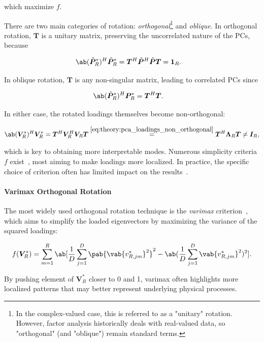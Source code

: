 which maximize $f$.

There are two main categories of rotation: \textit{orthogonal}\footnote{In the complex-valued case, this is referred to as a "unitary" rotation. However, factor analysis historically deals with real-valued data, so "orthogonal" (and "oblique") remain standard terms.} and \textit{oblique}. In orthogonal rotation, $\bm{T}$ is a unitary matrix, preserving the uncorrelated nature of the PCs, because

\begin{align*}
    \ab(\bmn{P}_R^*)^H\bmn{P}_R^* &= \bm{T}^H\bmn{P}^H\bmn{P}\bm{T} = \bm{1}_R.
\end{align*}

In oblique rotation, $\bm{T}$ is any non-singular matrix, leading to correlated PCs since

\begin{align*}
    \ab(\bmn{P}_R^*)^H\bm{P}_R^* &= \bm{T}^H\bm{T}.
\end{align*}

In either case, the rotated loadings themselves become non-orthogonal:

\begin{align}
    \ab(\bm{V}_R^*)^H \bm{V}_R^* = \bm{T}^H \bm{V}_R^H  \bm{V}_R \bm{T} \overset{\eqref{eq:theory:pca_loadings_non_orthogonal}}{=} \bm{T}^H \bm{\Lambda}_R \bm{T} \neq \bm{I}_R,
\end{align}

which is key to obtaining more interpretable modes. Numerous simplicity criteria $f$ exist~\cite[see e.g.][]{richman_rotation_1986}, most aiming to make loadings more localized. In practice, the specific choice of criterion often has limited impact on the results~\cite{richman_rotation_1986}.

\paragraph{Varimax Orthogonal Rotation} The most widely used orthogonal rotation technique is the \emph{varimax} criterion~\cite{kaiser_varimax_1958}, which aims to simplify the loaded eigenvectors by maximizing the variance of the squared loadings:

\begin{align}
    f(\bm{V}_R^*) = \sum_{m=1}^{R} \ab[ \frac{1}{D} \sum_{j=1}^{D} \pab{\vab{v_{R, jm}^*}^2}^2 - \ab( \frac{1}{D} \sum_{j=1}^{D} \vab{v_{R, jm}^*}^2 )^2 ].
\end{align}

By pushing element of $\bm{V}_R^*$ closer to \num{0} and \num{1}, varimax often highlights more localized patterns that may better represent underlying physical processes.

